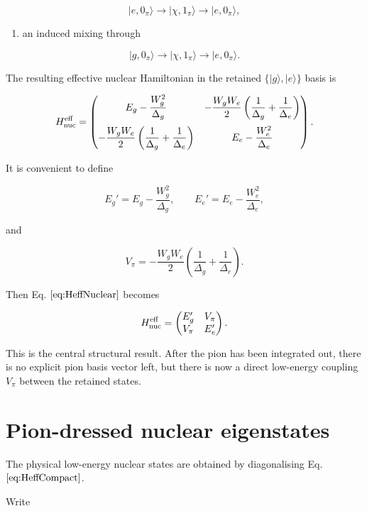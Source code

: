 \documentclass[
]{article}
\renewcommand{\[}{\begin{equation}}
\renewcommand{\]}{\end{equation}}
\providecommand{\tightlist}{%
  \setlength{\itemsep}{0pt}\setlength{\parskip}{0pt}}
\begin{document}
\[
|e,0_\pi\rangle \to |\chi,1_\pi\rangle \to |e,0_\pi\rangle,
\]

\begin{enumerate}
\def\labelenumi{\arabic{enumi}.}
\setcounter{enumi}{2}
\tightlist
\item
  an induced mixing through
\end{enumerate}

\[
|g,0_\pi\rangle \to |\chi,1_\pi\rangle \to |e,0_\pi\rangle.
\]

The resulting effective nuclear Hamiltonian in the retained
\(\{|g\rangle,|e\rangle\}\) basis is

\[
H_{\rm nuc}^{\rm eff} =
\begin{pmatrix}
E_g - \dfrac{W_g^2}{\Delta_g}
&
-\dfrac{W_gW_e}{2}
\left(
\dfrac{1}{\Delta_g}
+
\dfrac{1}{\Delta_e}
\right)
\\[1.2em]
-\dfrac{W_gW_e}{2}
\left(
\dfrac{1}{\Delta_g}
+
\dfrac{1}{\Delta_e}
\right)
&
E_e - \dfrac{W_e^2}{\Delta_e}
\end{pmatrix}.
\label{eq:HeffNuclear}
\]

It is convenient to define

\[
E_g' = E_g - \frac{W_g^2}{\Delta_g},
\qquad
E_e' = E_e - \frac{W_e^2}{\Delta_e},
\label{eq:dressedDiagE}
\]

and

\[
V_\pi =
-\frac{W_gW_e}{2}
\left(
\frac{1}{\Delta_g}
+
\frac{1}{\Delta_e}
\right).
\label{eq:VpiEff}
\]

Then Eq. \(\ref{eq:HeffNuclear}\) becomes

\[
H_{\rm nuc}^{\rm eff} =
\begin{pmatrix}
E_g' & V_\pi \\
V_\pi & E_e'
\end{pmatrix}.
\label{eq:HeffCompact}
\]

This is the central structural result. After the pion has been
integrated out, there is no explicit pion basis vector left, but there
is now a direct low-energy coupling \(V_\pi\) between the retained
states.

\section{Pion-dressed nuclear
eigenstates}\label{pion-dressed-nuclear-eigenstates}

The physical low-energy nuclear states are obtained by diagonalising Eq.
\(\ref{eq:HeffCompact}\).

Write
\end{document}
